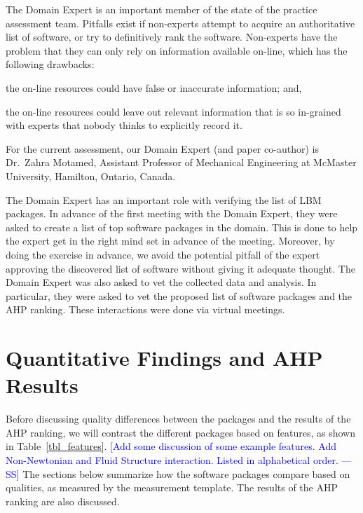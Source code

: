 \documentclass[final, 3p, times, authoryear]{elsarticle}
\newcommand{\authornote}[3]{\textcolor{#1}{[#3 ---#2]}}
\newcommand{\authornote}[3]{}
\newcommand{\wss}[1]{\authornote{blue}{SS}{#1}} %
\begin{document}
The Domain Expert is an important member of the state of the practice assessment
team. Pitfalls exist if non-experts attempt to acquire an authoritative list of
software, or try to definitively rank the software. Non-experts have the problem
that they can only rely on information available on-line, which has the
following drawbacks:
\begin{inparaenum}[i)]
  \item the on-line resources could have false or inaccurate information; and,
  \item the on-line resources could leave out relevant information that is so
in-grained with experts that nobody thinks to explicitly record it.
\end{inparaenum}
For the current assessment, our Domain Expert (and paper co-author) is Dr.\
Zahra Motamed, Assistant Professor of Mechanical Engineering at McMaster
University, Hamilton, Ontario, Canada.  

The Domain Expert has an important role with verifying the list of LBM packages.
In advance of the first meeting with the Domain Expert, they were asked to
create a list of top software packages in the domain.  This is done to help the
expert get in the right mind set in advance of the meeting.  Moreover, by doing
the exercise in advance, we avoid the potential pitfall of the expert approving
the discovered list of software without giving it adequate thought.  The Domain
Expert was also asked to vet the collected data and analysis.  In particular,
they were asked to vet the proposed list of software packages and the AHP
ranking.  These interactions were done via virtual meetings.

\section{Quantitative Findings and AHP Results} \label{AHPresults}

Before discussing quality differences between the packages and the results of
the AHP ranking, we will contrast the different packages based on features, as
shown in Table~\ref{tbl_features}. \wss{Add some discussion of some example
features.  Add Non-Newtonian and Fluid Structure interaction.  Listed in
alphabetical order.}  The sections below summarize how the software packages
compare based on qualities, as measured by the measurement template.   The
results of the AHP ranking are also discussed.
\end{document}
